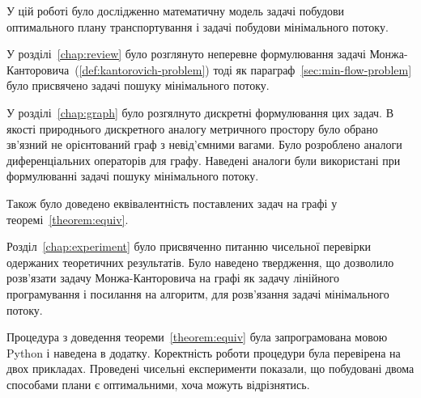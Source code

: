 У цій роботі було дослідженно математичну модель задачі побудови оптимального плану транспортування і
задачі побудови мінімального потоку.

У розділі~\ref{chap:review} було розглянуто неперевне формулювання задачі Монжа-Канторовича~(\ref{def:kantorovich-problem})
тоді як параграф~\ref{sec:min-flow-problem} було присвячено задачі пошуку мінімального потоку.

У розділі~\ref{chap:graph} було розгялнуто дискретні формулювання цих задач. В якості природнього дискретного аналогу
метричного простору було обрано зв'язний не орієнтований граф з невід'ємними вагами. Було розроблено аналоги
диференціальних операторів для графу. Наведені аналоги були використані при формулюванні задачі пошуку мінімального потоку.

Також було доведено еквівалентність поставлених задач на графі у теоремі~\ref{theorem:equiv}.

Розділ~\ref{chap:experiment} було присвяченно питанню чисельної перевірки одержаних теоретичних результатів. Було
наведено твердження, що дозволило розв'язати задачу Монжа-Канторовича на графі як задачу
лінійного програмування і посилання на алгоритм, для розв'язання задачі мінімального потоку.

Процедура з доведення теореми~\ref{theorem:equiv} була запрограмована мовою Python і наведена в додатку.
Коректність роботи процедури була перевірена на двох прикладах. 
Проведені чисельні експерименти показали, що побудовані двома способами плани є оптимальними, хоча можуть відрізнятись.
